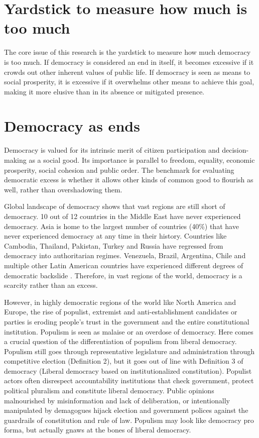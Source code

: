 \documentclass{scrartcl}
\theoremstyle{definition}
\begin{document}
\section{Yardstick to measure how much is too much}

The core issue of this research is the yardstick to measure how much
democracy is too much. If democracy is considered an end in itself,
it becomes excessive if it crowds out other inherent values of public
life. If democracy is seen as means to social prosperity, it is excessive
if it overwhelms other means to achieve this goal, making it more
elusive than in its absence or mitigated presence. 

\section{Democracy as ends}

Democracy is valued for its intrinsic merit of citizen participation
and decision-making as a social good. Its importance is parallel to
freedom, equality, economic prosperity, social cohesion and public
order. The benchmark for evaluating democratic excess is whether it
allows other kinds of common good to flourish as well, rather than
overshadowing them. 

Global landscape of democracy shows that vast regions are still short
of democracy. 10 out of 12 countries in the Middle East have never
experienced democracy. Asia is home to the largest number of countries
(40\%) that have never experienced democracy at any time in their
history. Countries like Cambodia, Thailand, Pakistan, Turkey and Russia
have regressed from democracy into authoritarian regimes. Venezuela,
Brazil, Argentina, Chile and multiple other Latin American countries
have experienced different degrees of democratic backslide \autocite{IDEA}.
Therefore, in vast regions of the world, democracy is a scarcity rather
than an excess. 

However, in highly democratic regions of the world like North America
and Europe, the rise of populist, extremist and anti-establishment
candidates or parties is eroding people's trust in the government
and the entire constitutional institution. Populism is seen as malaise
or an overdose of democracy. Here comes a crucial question of the
differentiation of populism from liberal democracy. Populism still
goes through representative legislature and administration through
competitive election (Definition 2), but it goes out of line with
Definition 3 of democracy (Liberal democracy based on institutionalized
constitution). Populist actors often disrespect accountability institutions
that check government, protect political pluralism and constitute
liberal democracy. Public opinions malnourished by misinformation
and lack of deliberation, or intentionally manipulated by demagogues
hijack election and government polices against the guardrails of constitution
and rule of law. Populism may look like democracy pro forma, but actually
gnaws at the bones of liberal democracy. 
\end{document}
